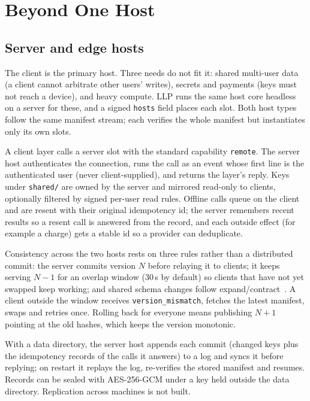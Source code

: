 \documentclass[10pt,twocolumn]{article}
\newcommand{\code}[1]{\texttt{#1}}
\newcommand{\s}{\,s\xspace}
\begin{document}
\section{Beyond One Host}
\label{sec:beyond}

\subsection{Server and edge hosts}

The client is the primary host. Three needs do not fit it: shared multi-user data (a client cannot
arbitrate other users' writes), secrets and payments (keys must not reach a device), and heavy
compute. LLP runs the same host core headless on a server for these, and a signed \code{hosts}
field places each slot. Both host types follow the same manifest stream; each verifies the whole
manifest but instantiates only its own slots.

A client layer calls a server slot with the standard capability \code{remote}. The server host
authenticates the connection, runs the call as an event whose first line is the authenticated user
(never client-supplied), and returns the layer's reply. Keys under \code{shared/} are owned by the
server and mirrored read-only to clients, optionally filtered by signed per-user read rules.
Offline calls queue on the client and are resent with their original idempotency id; the server
remembers recent results so a resent call is answered from the record, and each outside effect
(for example a charge) gets a stable id so a provider can deduplicate.

Consistency across the two hosts rests on three rules rather than a distributed commit:
the server commits version $N$ before relaying it to clients; it keeps serving $N{-}1$ for an
overlap window (30\s by default) so clients that have not yet swapped keep working; and shared
schema changes follow expand/contract~\cite{sato2014parallel}. A client outside the window
receives \code{version\_mismatch}, fetches the latest manifest, swaps and retries once. Rolling
back for everyone means publishing $N{+}1$ pointing at the old hashes, which keeps the version
monotonic.

With a data directory, the server host appends each commit (changed keys plus the idempotency
records of the calls it answers) to a log and syncs it before replying; on restart it replays the
log, re-verifies the stored manifest and resumes. Records can be sealed with AES-256-GCM under a
key held outside the data directory. Replication across machines is not built.
\end{document}
